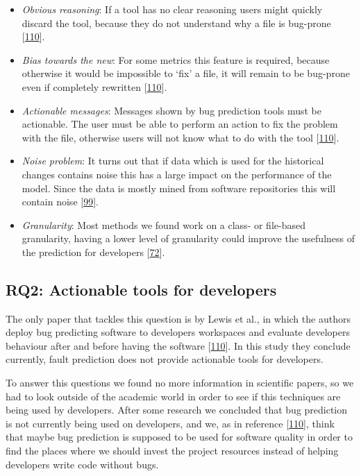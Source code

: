 \documentclass[]{book}
\providecommand{\tightlist}{%
  \setlength{\itemsep}{0pt}\setlength{\parskip}{0pt}}
\begin{document}
\begin{itemize}
\tightlist
\item
  \emph{Obvious reasoning}: If a tool has no clear reasoning users might
  quickly discard the tool, because they do not understand why a file is
  bug-prone {[}\protect\hyperlink{ref-Lewis2013}{110}{]}.
\item
  \emph{Bias towards the new}: For some metrics this feature is
  required, because otherwise it would be impossible to `fix' a file, it
  will remain to be bug-prone even if completely rewritten
  {[}\protect\hyperlink{ref-Lewis2013}{110}{]}.
\item
  \emph{Actionable messages}: Messages shown by bug prediction tools
  must be actionable. The user must be able to perform an action to fix
  the problem with the file, otherwise users will not know what to do
  with the tool {[}\protect\hyperlink{ref-Lewis2013}{110}{]}.
\item
  \emph{Noise problem}: It turns out that if data which is used for the
  historical changes contains noise this has a large impact on the
  performance of the model. Since the data is mostly mined from software
  repositories this will contain noise
  {[}\protect\hyperlink{ref-Kim2011}{99}{]}.
\item
  \emph{Granularity}: Most methods we found work on a class- or
  file-based granularity, having a lower level of granularity could
  improve the usefulness of the prediction for developers
  {[}\protect\hyperlink{ref-giger2012}{72}{]}.
\end{itemize}

\subsection{RQ2: Actionable tools for
developers}\label{rq2-actionable-tools-for-developers}

The only paper that tackles this question is by Lewis et al., in which
the authors deploy bug predicting software to developers workspaces and
evaluate developers behaviour after and before having the software
{[}\protect\hyperlink{ref-Lewis2013}{110}{]}. In this study they
conclude currently, fault prediction does not provide actionable tools
for developers.

To answer this questions we found no more information in scientific
papers, so we had to look outside of the academic world in order to see
if this techniques are being used by developers. After some research we
concluded that bug prediction is not currently being used on developers,
and we, as in reference {[}\protect\hyperlink{ref-Lewis2013}{110}{]},
think that maybe bug prediction is supposed to be used for software
quality in order to find the places where we should invest the project
resources instead of helping developers write code without bugs.
\end{document}
